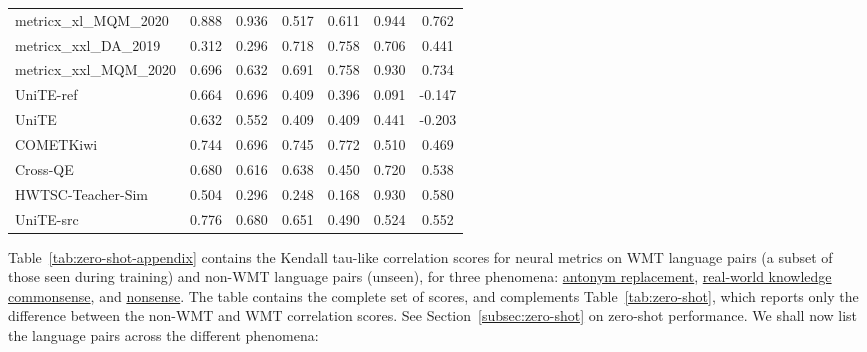 \documentclass[11pt]{article}
\begin{document}
\begin{table*}[t]
\begin{tabular}{lcccccc}
metricx\_xl\_MQM\_2020  & \phantom{-} 0.888  & \phantom{-} 0.936  & \phantom{-} 0.517 & \phantom{-} 0.611 & \phantom{-} 0.944  & \phantom{-} 0.762  \\
metricx\_xxl\_DA\_2019  & \phantom{-} 0.312  & \phantom{-} 0.296  & \phantom{-} 0.718 & \phantom{-} 0.758 & \phantom{-} 0.706  & \phantom{-} 0.441  \\
metricx\_xxl\_MQM\_2020 & \phantom{-} 0.696  & \phantom{-} 0.632  & \phantom{-} 0.691 & \phantom{-} 0.758 & \phantom{-} 0.930  & \phantom{-} 0.734  \\
UniTE-ref               & \phantom{-} 0.664  & \phantom{-} 0.696  & \phantom{-} 0.409 & \phantom{-} 0.396 & \phantom{-} 0.091  & -0.147 \\
UniTE                   & \phantom{-} 0.632  & \phantom{-} 0.552  & \phantom{-} 0.409 & \phantom{-} 0.409 & \phantom{-} 0.441  & -0.203 \\ \midrule
COMETKiwi               & \phantom{-} 0.744  & \phantom{-} 0.696  & \phantom{-} 0.745 & \phantom{-} 0.772 & \phantom{-} 0.510  & \phantom{-} 0.469  \\
Cross-QE                & \phantom{-} 0.680  & \phantom{-} 0.616  & \phantom{-} 0.638 & \phantom{-} 0.450 & \phantom{-} 0.720  & \phantom{-} 0.538  \\
HWTSC-Teacher-Sim       & \phantom{-} 0.504  & \phantom{-} 0.296  & \phantom{-} 0.248 & \phantom{-} 0.168 & \phantom{-} 0.930  & \phantom{-} 0.580  \\
UniTE-src               & \phantom{-} 0.776  & \phantom{-} 0.680  & \phantom{-} 0.651 & \phantom{-} 0.490 & \phantom{-} 0.524  & \phantom{-} 0.552  \\ 
 \bottomrule
\end{tabular}
\caption{Zero-shot performance of neural metrics on three phenomena to measure the ability of metrics to generalise to new language pairs. WMT language pairs consist of a subset of languages seen during training of the metrics, while non-WMT language pairs are unseen. Results show that the metrics are able to generalise to unseen languages. }
\label{tab:zero-shot-appendix}
\end{table*} Table~\ref{tab:zero-shot-appendix} contains the Kendall tau-like correlation scores for neural metrics on WMT language pairs (a subset of those seen during training) and non-WMT language pairs (unseen), for three phenomena: \hyperref[sec:antonym]{antonym replacement}, \hyperref[subsec:real-world-commonsense]{real-world knowledge commonsense}, and \hyperref[sec:nonsense]{nonsense}. The table contains the complete set of scores, and complements Table~\ref{tab:zero-shot}, which reports only the difference between the non-WMT and WMT correlation scores. See Section~\ref{subsec:zero-shot} on zero-shot performance. We shall now list the language pairs across the different phenomena: 
\end{document}

